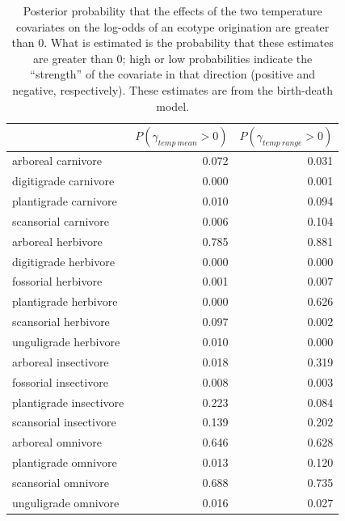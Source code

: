 \begin{table}[ht]
  \centering
  \caption[Posterior probablity of effects of temperature on origination]{Posterior probability that the effects of the two temperature covariates on the log-odds of an ecotype origination are greater than 0. What is estimated is the probability that these estimates are greater than 0; high or low probabilities indicate the ``strength'' of the covariate in that direction (positive and negative, respectively). These estimates are from the birth-death model.}
  \label{tab:origin_temp}
  \begin{tabular}{ l r r }
    \hline
    & \(P(\gamma_{temp\ mean} > 0)\) & \(P(\gamma_{temp\ range} > 0)\) \\ 
    \hline
    arboreal carnivore & 0.072 & 0.031 \\ 
    digitigrade carnivore & 0.000 & 0.001 \\ 
    plantigrade carnivore & 0.010 & 0.094 \\ 
    scansorial carnivore & 0.006 & 0.104 \\ 
    arboreal herbivore & 0.785 & 0.881 \\ 
    digitigrade herbivore & 0.000 & 0.000 \\ 
    fossorial herbivore & 0.001 & 0.007 \\ 
    plantigrade herbivore & 0.000 & 0.626 \\ 
    scansorial herbivore & 0.097 & 0.002 \\ 
    unguligrade herbivore & 0.010 & 0.000 \\ 
    arboreal insectivore & 0.018 & 0.319 \\ 
    fossorial insectivore & 0.008 & 0.003 \\ 
    plantigrade insectivore & 0.223 & 0.084 \\ 
    scansorial insectivore & 0.139 & 0.202 \\ 
    arboreal omnivore & 0.646 & 0.628 \\ 
    plantigrade omnivore & 0.013 & 0.120 \\ 
    scansorial omnivore & 0.688 & 0.735 \\ 
    unguligrade omnivore & 0.016 & 0.027 \\ 
    \hline
  \end{tabular}
\end{table}

